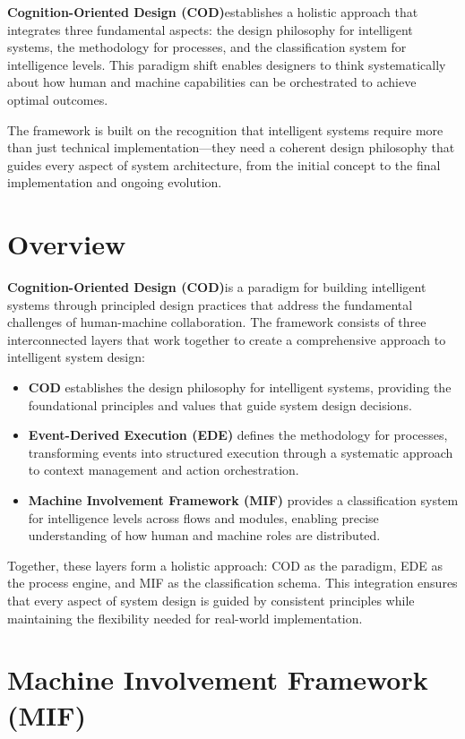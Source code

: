 \documentclass[12pt,a4paper]{article}
\newcommand{\cod}{\textbf{Cognition-Oriented Design (COD)}}
\begin{document}
\cod establishes a holistic approach that integrates three fundamental aspects: the design philosophy for intelligent systems, the methodology for processes, and the classification system for intelligence levels. This paradigm shift enables designers to think systematically about how human and machine capabilities can be orchestrated to achieve optimal outcomes.

The framework is built on the recognition that intelligent systems require more than just technical implementation—they need a coherent design philosophy that guides every aspect of system architecture, from the initial concept to the final implementation and ongoing evolution.

\section{Overview}

\cod is a paradigm for building intelligent systems through principled design practices that address the fundamental challenges of human-machine collaboration. The framework consists of three interconnected layers that work together to create a comprehensive approach to intelligent system design:

\begin{itemize}
\item \textbf{COD} establishes the design philosophy for intelligent systems, providing the foundational principles and values that guide system design decisions.
\item \textbf{Event-Derived Execution (EDE)} defines the methodology for processes, transforming events into structured execution through a systematic approach to context management and action orchestration.
\item \textbf{Machine Involvement Framework (MIF)} provides a classification system for intelligence levels across flows and modules, enabling precise understanding of how human and machine roles are distributed.
\end{itemize}

Together, these layers form a holistic approach: COD as the paradigm, EDE as the process engine, and MIF as the classification schema. This integration ensures that every aspect of system design is guided by consistent principles while maintaining the flexibility needed for real-world implementation.

\section{Machine Involvement Framework (MIF)}
\end{document}
